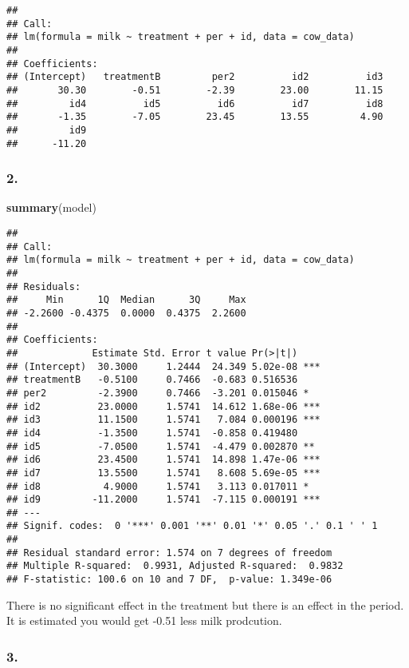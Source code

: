 \documentclass[11pt,]{article}
\newenvironment{Shaded}{\begin{snugshade}}{\end{snugshade}}
\newcommand{\KeywordTok}[1]{\textcolor[rgb]{0.13,0.29,0.53}{\textbf{{#1}}}}
\newcommand{\NormalTok}[1]{{#1}}
\begin{document}
\begin{verbatim}
## 
## Call:
## lm(formula = milk ~ treatment + per + id, data = cow_data)
## 
## Coefficients:
## (Intercept)   treatmentB         per2          id2          id3  
##       30.30        -0.51        -2.39        23.00        11.15  
##         id4          id5          id6          id7          id8  
##       -1.35        -7.05        23.45        13.55         4.90  
##         id9  
##      -11.20
\end{verbatim}

\subsubsection{2.}\label{section-17}

\begin{Shaded}
\begin{Highlighting}[]
\KeywordTok{summary}\NormalTok{(model)}
\end{Highlighting}
\end{Shaded}

\begin{verbatim}
## 
## Call:
## lm(formula = milk ~ treatment + per + id, data = cow_data)
## 
## Residuals:
##     Min      1Q  Median      3Q     Max 
## -2.2600 -0.4375  0.0000  0.4375  2.2600 
## 
## Coefficients:
##             Estimate Std. Error t value Pr(>|t|)    
## (Intercept)  30.3000     1.2444  24.349 5.02e-08 ***
## treatmentB   -0.5100     0.7466  -0.683 0.516536    
## per2         -2.3900     0.7466  -3.201 0.015046 *  
## id2          23.0000     1.5741  14.612 1.68e-06 ***
## id3          11.1500     1.5741   7.084 0.000196 ***
## id4          -1.3500     1.5741  -0.858 0.419480    
## id5          -7.0500     1.5741  -4.479 0.002870 ** 
## id6          23.4500     1.5741  14.898 1.47e-06 ***
## id7          13.5500     1.5741   8.608 5.69e-05 ***
## id8           4.9000     1.5741   3.113 0.017011 *  
## id9         -11.2000     1.5741  -7.115 0.000191 ***
## ---
## Signif. codes:  0 '***' 0.001 '**' 0.01 '*' 0.05 '.' 0.1 ' ' 1
## 
## Residual standard error: 1.574 on 7 degrees of freedom
## Multiple R-squared:  0.9931, Adjusted R-squared:  0.9832 
## F-statistic: 100.6 on 10 and 7 DF,  p-value: 1.349e-06
\end{verbatim}

There is no significant effect in the treatment but there is an effect
in the period. It is estimated you would get -0.51 less milk prodcution.

\subsubsection{3.}\label{section-18}
\end{document}
